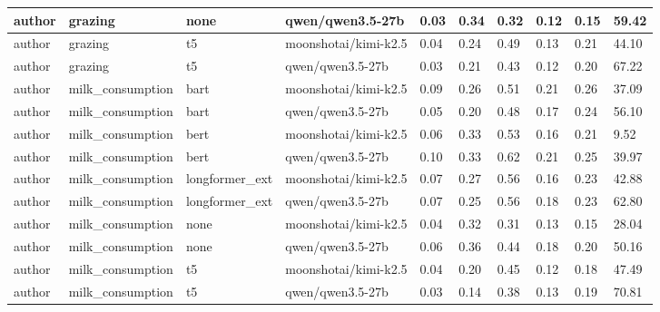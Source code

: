 \begin{tabular}{|l|l|l|l|l|l|l|l|l|l|}
 \hline
 author & grazing & none & qwen/qwen3.5-27b & 0.03 & 0.34 & 0.32 & 0.12 & 0.15 & 59.42 \\
 \hline
 author & grazing & t5 & moonshotai/kimi-k2.5 & 0.04 & 0.24 & 0.49 & 0.13 & 0.21 & 44.10 \\
 \hline
 author & grazing & t5 & qwen/qwen3.5-27b & 0.03 & 0.21 & 0.43 & 0.12 & 0.20 & 67.22 \\
 \hline
 author & milk\_consumption & bart & moonshotai/kimi-k2.5 & 0.09 & 0.26 & 0.51 & 0.21 & 0.26 & 37.09 \\
 \hline
 author & milk\_consumption & bart & qwen/qwen3.5-27b & 0.05 & 0.20 & 0.48 & 0.17 & 0.24 & 56.10 \\
 \hline
 author & milk\_consumption & bert & moonshotai/kimi-k2.5 & 0.06 & 0.33 & 0.53 & 0.16 & 0.21 & 9.52 \\
 \hline
 author & milk\_consumption & bert & qwen/qwen3.5-27b & 0.10 & 0.33 & 0.62 & 0.21 & 0.25 & 39.97 \\
 \hline
 author & milk\_consumption & longformer\_ext & moonshotai/kimi-k2.5 & 0.07 & 0.27 & 0.56 & 0.16 & 0.23 & 42.88 \\
 \hline
 author & milk\_consumption & longformer\_ext & qwen/qwen3.5-27b & 0.07 & 0.25 & 0.56 & 0.18 & 0.23 & 62.80 \\
 \hline
 author & milk\_consumption & none & moonshotai/kimi-k2.5 & 0.04 & 0.32 & 0.31 & 0.13 & 0.15 & 28.04 \\
 \hline
 author & milk\_consumption & none & qwen/qwen3.5-27b & 0.06 & 0.36 & 0.44 & 0.18 & 0.20 & 50.16 \\
 \hline
 author & milk\_consumption & t5 & moonshotai/kimi-k2.5 & 0.04 & 0.20 & 0.45 & 0.12 & 0.18 & 47.49 \\
 \hline
 author & milk\_consumption & t5 & qwen/qwen3.5-27b & 0.03 & 0.14 & 0.38 & 0.13 & 0.19 & 70.81 \\
\hline
\end{tabular}
